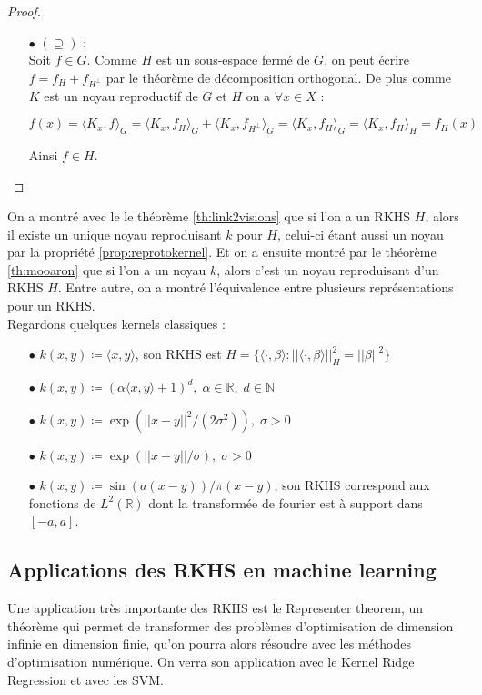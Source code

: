 \documentclass[a4paper, 11pt, french]{article}
\theoremstyle{definition}
\begin{document}
\begin{proof}
\begin{itemize}
			\item[$\bullet$]
			$(\supseteq)$ : \\
			Soit $f \in G$. Comme $H$ est un sous-espace fermé de $G$, on peut écrire $f = f_{H} + f_{H^\perp}$ par le théorème de décomposition orthogonal. De plus comme $K$ est un noyau reproductif de $G$ et $H$ on a $\forall x \in X$ :
			
			\[f(x) = \langle K_x, f \rangle_G = \langle K_x, f_{H} \rangle_G + \langle K_x, f_{H^\perp} \rangle_G = \langle K_x, f_{H} \rangle_G = \langle K_x, f_{H} \rangle_H = f_H (x) \]
			
			Ainsi $f \in H$.
		\end{itemize}	
	\end{proof}

	On a montré avec le le théorème \ref{th:link2visions} que si l'on a un RKHS $H$, alors il existe un unique noyau reproduisant $k$ pour $H$, celui-ci étant aussi un noyau par la propriété  \ref{prop:reprotokernel}. Et on a ensuite montré par le théorème \ref{th:mooaron} que si l'on a un noyau $k$, alors c'est un noyau reproduisant d'un RKHS $H$. Entre autre, on a montré l'équivalence entre plusieurs représentations pour un RKHS. \\
	
	Regardons quelques kernels classiques :
	\begin{itemize}
		\item[$\bullet$] $k(x, y) \coloneqq \langle x, y \rangle$, son RKHS est $H = \{\langle \cdot, \beta \rangle : ||\langle \cdot, \beta \rangle||_H^2 = ||\beta||^2\}$
		\item[$\bullet$] $k(x, y) \coloneqq (\alpha \langle x, y \rangle + 1)^d, \; \alpha \in \mathbb{R}, \; d \in \mathbb{N}$
		\item[$\bullet$] $k(x, y) \coloneqq \exp(||x-y||^2 / (2\sigma^2)), \; \sigma > 0$
		\item[$\bullet$] $k(x, y) \coloneqq \exp(||x-y|| / \sigma), \; \sigma > 0$
		\item[$\bullet$] $k(x, y) \coloneqq \sin (a(x-y)) / \pi (x-y)$, son RKHS correspond aux fonctions de $L^2(\mathbb{R})$ dont la transformée de fourier est à support dans $[-a, a]$.
	\end{itemize}
	
	\subsection{Applications des RKHS en machine learning}
	
	Une application très importante des RKHS est le Representer theorem, un théorème qui permet de transformer des problèmes d'optimisation de dimension infinie en dimension finie, qu'on pourra alors résoudre avec les méthodes d'optimisation numérique. On verra son application avec le Kernel Ridge Regression et avec les SVM.
	
\end{document}
